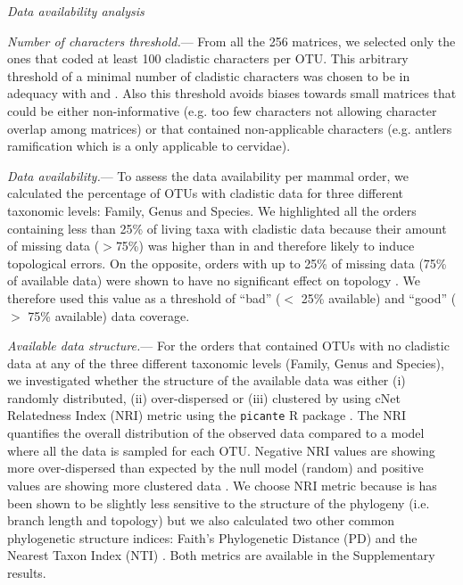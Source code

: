 \documentclass[12pt,letterpaper]{article}
\renewcommand{\subsection}[1]{%
\bigskip
\begin{center}
\begin{large}
\normalfont\itshape #1
\end{large}
\end{center}}
\renewcommand{\subsubsection}[1]{%
\vspace{2ex}
\noindent
\textit{#1.}---}
\begin{document}
\subsection{Data availability analysis}
\subsubsection{Number of characters threshold}
From all the 256 %
matrices, we selected only the ones that coded at least 100 cladistic characters per OTU.
This arbitrary threshold of a minimal number of cladistic characters was chosen to be in adequacy with \citep{GuillermeCooper} and \citep{harrisonamong-character2014}.
Also this threshold avoids biases towards small matrices that could be either non-informative \citep{wagner2000} (e.g. too few characters not allowing character overlap among matrices) or that contained non-applicable characters \citep{Brazeau2011} (e.g. antlers ramification which is a only applicable to cervidae).

\subsubsection{Data availability}
To assess the data availability per mammal order, we calculated the percentage of OTUs with cladistic data for three different taxonomic levels: Family, Genus and Species.
We highlighted all the orders containing less than 25\% of living taxa with cladistic data because their amount of missing data ($>$75\%) was higher than in \citep{GuillermeCooper} and therefore likely to induce topological errors.
On the opposite, orders with up to 25\% of missing data (75\% of available data) were shown to have no significant effect on topology \citep{GuillermeCooper}.
We therefore used this value as a threshold of ``bad'' ($<$ 25\% available) and ``good'' ($>$ 75\% available) data coverage.

\subsubsection{Available data structure}
For the orders that contained OTUs with no cladistic data at any of the three different taxonomic levels (Family, Genus and Species), we investigated whether the structure of the available data was either (i) randomly distributed, (ii) over-dispersed or (iii) clustered by using cNet Relatedness Index (NRI) metric \citep{webb2002phylogenies} using the \texttt{picante} R package \citep{picante}.
The NRI quantifies the overall distribution of the observed data compared to a model where all the data is sampled for each OTU. Negative NRI values are showing more over-dispersed than expected by the null model (random) and positive values are showing more clustered data \citep{webb2002phylogenies}.
We choose NRI metric because is has been shown to be slightly less sensitive to the structure of the phylogeny (i.e. branch length and topology) \citep{NRI,journal.pone.0004390} but we also calculated two other common phylogenetic structure indices: Faith's Phylogenetic Distance (PD) \citep{Faith19921} and the Nearest Taxon Index (NTI) \citep{webb2002phylogenies}.
Both metrics are available in the Supplementary results.
\end{document}
